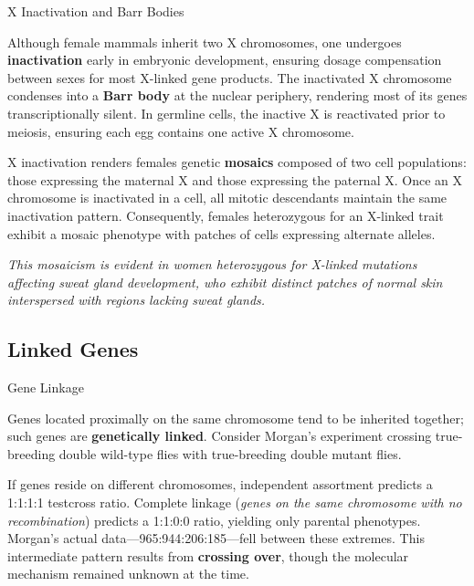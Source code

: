 \documentclass[10pt]{article}
\begin{document}
    \begin{core}{X Inactivation and Barr Bodies}

      Although female mammals inherit two X chromosomes, one undergoes \textbf{inactivation} early in embryonic development, ensuring dosage compensation between sexes for most X-linked gene products. The inactivated X chromosome condenses into a \textbf{Barr body} at the nuclear periphery, rendering most of its genes transcriptionally silent. In germline cells, the inactive X is reactivated prior to meiosis, ensuring each egg contains one active X chromosome.

      X inactivation renders females genetic \textbf{mosaics} composed of two cell populations: those expressing the maternal X and those expressing the paternal X. Once an X chromosome is inactivated in a cell, all mitotic descendants maintain the same inactivation pattern. Consequently, females heterozygous for an X-linked trait exhibit a mosaic phenotype with patches of cells expressing alternate alleles.


      \textit{This mosaicism is evident in women heterozygous for X-linked mutations affecting sweat gland development, who exhibit distinct patches of normal skin interspersed with regions lacking sweat glands.}

    \end{core}

  \subsection{Linked Genes}

    \begin{core}{Gene Linkage}

      Genes located proximally on the same chromosome tend to be inherited together; such genes are \textbf{genetically linked}. Consider Morgan's experiment crossing true-breeding double wild-type flies with true-breeding double mutant flies.


      If genes reside on different chromosomes, independent assortment predicts a 1:1:1:1 testcross ratio. Complete linkage (\textit{genes on the same chromosome with no recombination}) predicts a 1:1:0:0 ratio, yielding only parental phenotypes. Morgan's actual data---965:944:206:185---fell between these extremes. This intermediate pattern results from \textbf{crossing over}, though the molecular mechanism remained unknown at the time.

    \end{core}    
\end{document}
